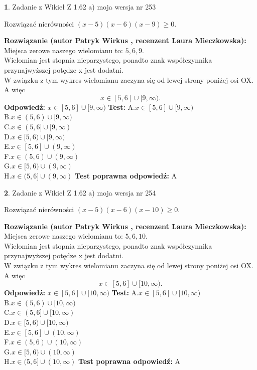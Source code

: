 \documentclass[12pt, a4paper]{article}
\theoremstyle{definition} %
\newtheorem{zad}{}
\newcommand{\zadStart}[1]{\begin{zad}#1\newline}
\newcommand{\zadStop}{\end{zad}}
\newcommand{\rozwStart}[2]{\noindent \textbf{Rozwiązanie (autor #1 , recenzent #2): }\newline}
\newcommand{\rozwStop}{\newline}
\newcommand{\odpStart}{\noindent \textbf{Odpowiedź:}\newline}
\newcommand{\odpStop}{\newline}
\newcommand{\testStart}{\noindent \textbf{Test:}\newline}
\newcommand{\testStop}{\newline}
\newcommand{\kluczStart}{\noindent \textbf{Test poprawna odpowiedź:}\newline}
\newcommand{\kluczStop}{\newline}
\begin{document}
\zadStart{Zadanie z Wikieł Z 1.62 a) moja wersja nr 253}

Rozwiązać nierówności $(x-5)(x-6)(x-9)\ge0$.
\zadStop
\rozwStart{Patryk Wirkus}{Laura Mieczkowska}
Miejsca zerowe naszego wielomianu to: $5, 6, 9$.\\
Wielomian jest stopnia nieparzystego, ponadto znak współczynnika przy\linebreak najwyższej potędze x jest dodatni.\\ W związku z tym wykres wielomianu zaczyna się od lewej strony poniżej osi OX. A więc $$x \in [5,6] \cup [9,\infty).$$
\rozwStop
\odpStart
$x \in [5,6] \cup [9,\infty)$
\odpStop
\testStart
A.$x \in [5,6] \cup [9,\infty)$\\
B.$x \in (5,6) \cup [9,\infty)$\\
C.$x \in (5,6] \cup [9,\infty)$\\
D.$x \in [5,6) \cup [9,\infty)$\\
E.$x \in [5,6] \cup (9,\infty)$\\
F.$x \in (5,6) \cup (9,\infty)$\\
G.$x \in [5,6) \cup (9,\infty)$\\
H.$x \in (5,6] \cup (9,\infty)$
\testStop
\kluczStart
A
\kluczStop



\zadStart{Zadanie z Wikieł Z 1.62 a) moja wersja nr 254}

Rozwiązać nierówności $(x-5)(x-6)(x-10)\ge0$.
\zadStop
\rozwStart{Patryk Wirkus}{Laura Mieczkowska}
Miejsca zerowe naszego wielomianu to: $5, 6, 10$.\\
Wielomian jest stopnia nieparzystego, ponadto znak współczynnika przy\linebreak najwyższej potędze x jest dodatni.\\ W związku z tym wykres wielomianu zaczyna się od lewej strony poniżej osi OX. A więc $$x \in [5,6] \cup [10,\infty).$$
\rozwStop
\odpStart
$x \in [5,6] \cup [10,\infty)$
\odpStop
\testStart
A.$x \in [5,6] \cup [10,\infty)$\\
B.$x \in (5,6) \cup [10,\infty)$\\
C.$x \in (5,6] \cup [10,\infty)$\\
D.$x \in [5,6) \cup [10,\infty)$\\
E.$x \in [5,6] \cup (10,\infty)$\\
F.$x \in (5,6) \cup (10,\infty)$\\
G.$x \in [5,6) \cup (10,\infty)$\\
H.$x \in (5,6] \cup (10,\infty)$
\testStop
\kluczStart
A
\kluczStop
\end{document}

